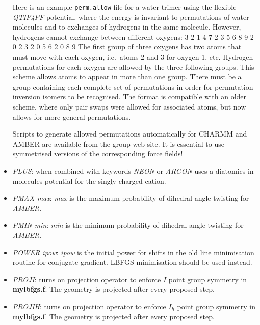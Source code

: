 \documentclass[12pt,a4paper,dvips]{article}
\begin{document}
\begin{itemize}
Here is an example {\tt perm.allow} file for a water trimer using
the flexible {\it QTIP4PF\/} potential, where the energy is invariant to permutations
of water molecules and to exchanges of hydrogens in the same molecule. However,
hydrogens cannot exchange between different oxygens:
{
3 2
1 4 7 2 3 5 6 8 9
2 0 
2 3
2 0 
5 6
2 0 
8 9
}
The first group of three oxygens has two atoms that must move with each oxygen,
i.e.~atoms 2 and 3 for oxygen 1, etc. Hydrogen permutations for each oxygen are
allowed by the three following groups. This scheme allows atoms to appear in more 
than one group. There must be a group containing each complete set of permutations
in order for permutation-inversion isomers to be recognised. The format
is compatible with an older scheme, where only pair swaps were allowed for
associated atoms, but now allows for more general permutations.

Scripts to generate allowed permutations automatically for CHARMM and AMBER are available from
the group web site. It is essential to use symmetrised versions of the corresponding
force fields! 


\item {\it PLUS\/}: when combined with keywords {\it NEON\/} or {\it ARGON\/}
uses a diatomics-in-molecules potential for the singly charged cation.

\item {\it PMAX max\/}: {\it max\/} is the maximum probability of dihedral angle twisting for {\it AMBER\/}.

\item {\it PMIN min\/}: {\it min\/} is the minimum probability of dihedral angle twisting for {\it AMBER\/}.

\item {\it POWER ipow\/}: {\it ipow\/} is the initial power for shifts in the old line minimisation routine
for conjugate gradient. LBFGS minimisation should be used instead.

\item {\it PROJI\/}: turns on projection operator to enforce $I$ point group symmetry
in {\bf mylbfgs.f}. The geometry is projected after every proposed step.

\item {\it PROJIH\/}: turns on projection operator to enforce $I_h$ point group symmetry
in {\bf mylbfgs.f}. The geometry is projected after every proposed step.


\end{itemize}
\end{document}
